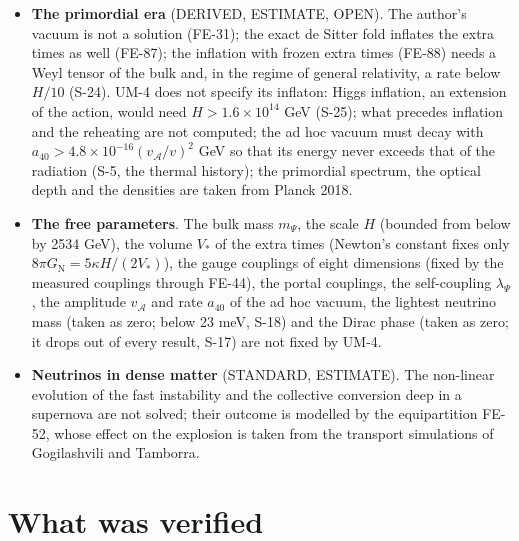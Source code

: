 \documentclass[
  10pt,
]{article}
\begin{document}
\begin{itemize}
  an extra time); the time \(x_4\) is a time function only on the
  sections of fixed extra times, on which UM-4 lives, and only there
  does the bulk give no shortcut to signals (FE-83). Of the
  polarisations of the graviton of the bulk the three vectors
  \(h_{\mu r}\) are ghosts (FE-76); the matter of the fold does not emit
  them at the linear order, but they remain a defect of the bulk gravity
  of signature (3, 4) at higher orders (OPEN).
\item
  \textbf{The primordial era} (DERIVED, ESTIMATE, OPEN). The author's
  vacuum is not a solution (FE-31); the exact de Sitter fold inflates
  the extra times as well (FE-87); the inflation with frozen extra times
  (FE-88) needs a Weyl tensor of the bulk and, in the regime of general
  relativity, a rate below \(H/10\) (S-24). UM-4 does not specify its
  inflaton: Higgs inflation, an extension of the action, would need
  \(H > 1.6\times10^{14}\) GeV (S-25); what precedes inflation and the
  reheating are not computed; the ad hoc vacuum must decay with
  \(a_{40} > 4.8\times10^{-16}(v_{\mathcal{A}}/v)^2\) GeV so that its
  energy never exceeds that of the radiation (S-5, the thermal history);
  the primordial spectrum, the optical depth and the densities are taken
  from Planck 2018.
\item
  \textbf{The free parameters}. The bulk mass \(m_\Psi\), the scale
  \(H\) (bounded from below by 2534 GeV), the volume \(V_*\) of the
  extra times (Newton's constant fixes only
  \(8\pi G_{\mathrm{N}} = 5\kappa H/(2V_*)\)), the gauge couplings of
  eight dimensions (fixed by the measured couplings through FE-44), the
  portal couplings, the self-coupling \(\lambda_\Psi\), the amplitude
  \(v_{\mathcal{A}}\) and rate \(a_{40}\) of the ad hoc vacuum, the
  lightest neutrino mass (taken as zero; below 23 meV, S-18) and the
  Dirac phase (taken as zero; it drops out of every result, S-17) are
  not fixed by UM-4.
\item
  \textbf{Neutrinos in dense matter} (STANDARD, ESTIMATE). The
  non-linear evolution of the fast instability and the collective
  conversion deep in a supernova are not solved; their outcome is
  modelled by the equipartition FE-52, whose effect on the explosion is
  taken from the transport simulations of Gogilashvili and Tamborra.
\end{itemize}

\hypertarget{what-was-verified}{%
\section{What was verified}\label{what-was-verified}}
\end{document}

